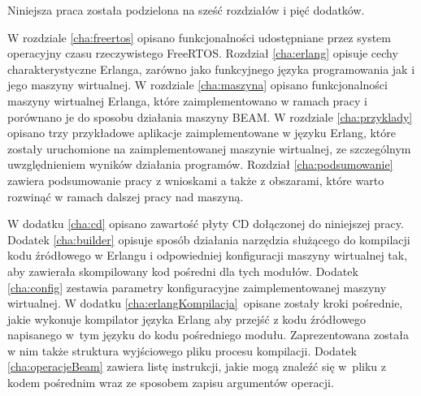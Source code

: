 Niniejsza praca została podzielona na sześć rozdziałów i pięć dodatków.

W rozdziale \ref{cha:freertos} opisano funkcjonalności udostępniane przez system operacyjny czasu rzeczywistego FreeRTOS.
Rozdział \ref{cha:erlang} opisuje cechy charakterystyczne Erlanga, zarówno jako funkcyjnego języka programowania jak i jego maszyny wirtualnej.
W rozdziale \ref{cha:maszyna} opisano funkcjonalności maszyny wirtualnej Erlanga, które zaimplementowano w ramach pracy i porównano je do sposobu działania maszyny BEAM.
W rozdziale \ref{cha:przyklady} opisano trzy przykładowe aplikacje zaimplementowane w języku Erlang, które zostały uruchomione na zaimplementowanej maszynie wirtualnej, ze szczególnym uwzględnieniem wyników działania programów.
Rozdział \ref{cha:podsumowanie} zawiera podsumowanie pracy z wnioskami a także z obszarami, które warto rozwinąć w ramach dalszej pracy nad maszyną.

W dodatku \ref{cha:cd} opisano zawartość płyty CD dołączonej do niniejszej pracy.
Dodatek \ref{cha:builder} opisuje sposób działania narzędzia służącego do kompilacji kodu źródłowego w Erlangu i odpowiedniej konfiguracji maszyny wirtualnej tak, aby zawierała skompilowany kod pośredni dla tych modułów.
Dodatek \ref{cha:config} zestawia parametry konfiguracyjne zaimplementowanej maszyny wirtualnej.
W dodatku \ref{cha:erlangKompilacja}~opisane zostały kroki pośrednie, jakie wykonuje kompilator języka Erlang aby przejść z kodu źródłowego napisanego w~tym języku do kodu pośredniego modułu. Zaprezentowana została w nim także struktura wyjściowego pliku procesu kompilacji.
Dodatek \ref{cha:operacjeBeam} zawiera listę instrukcji, jakie mogą znaleźć się w~pliku z kodem pośrednim wraz ze sposobem zapisu argumentów operacji.

